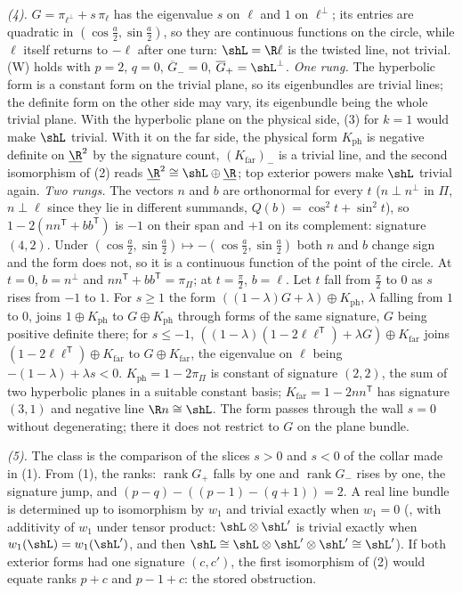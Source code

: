 \emph{(4).} $G = \pi_{\ell^{\perp}} + s\,\pi_{\ell}$ has the eigenvalue $s$ on $\ell$ and $1$ on $\ell^{\perp}$; its entries are quadratic in $(\cos\tfrac a2, \sin\tfrac a2)$, so they are continuous functions on the circle, while $\ell$ itself returns to $-\ell$ after one turn: $\shL = \R\ell$ is the twisted line, not trivial. (W) holds with $p = 2$, $q = 0$, $\overline G_{-} = 0$, $\overline G_{+} = \shL^{\perp}$. \emph{One rung.} The hyperbolic form is a constant form on the trivial plane, so its eigenbundles are trivial lines; the definite form on the other side may vary, its eigenbundle being the whole trivial plane. With the hyperbolic plane on the physical side, (3) for $k = 1$ would make $\shL$ trivial. With it on the far side, the physical form $K_{\mathrm{ph}}$ is negative definite on $\underline{\R}^{2}$ by the signature count, $(K_{\mathrm{far}})_{-}$ is a trivial line, and the second isomorphism of (2) reads $\underline{\R}^{2} \cong \shL \oplus \underline{\R}$; top exterior powers make $\shL$ trivial again. \emph{Two rungs.} The vectors $n$ and $b$ are orthonormal for every $t$ ($n \perp n^{\perp}$ in $\Pi$, $n \perp \ell$ since they lie in different summands, $Q(b) = \cos^{2}t + \sin^{2}t$), so $1 - 2(nn^{\mathsf T} + bb^{\mathsf T})$ is $-1$ on their span and $+1$ on its complement: signature $(4,2)$. Under $(\cos\tfrac a2, \sin\tfrac a2) \mapsto -(\cos\tfrac a2, \sin\tfrac a2)$ both $n$ and $b$ change sign and the form does not, so it is a continuous function of the point of the circle. At $t = 0$, $b = n^{\perp}$ and $nn^{\mathsf T} + bb^{\mathsf T} = \pi_{\Pi}$; at $t = \tfrac\pi2$, $b = \ell$. Let $t$ fall from $\tfrac\pi2$ to $0$ as $s$ rises from $-1$ to $1$. For $s \geq 1$ the form $((1-\lambda)G + \lambda) \oplus K_{\mathrm{ph}}$, $\lambda$ falling from $1$ to $0$, joins $1 \oplus K_{\mathrm{ph}}$ to $G \oplus K_{\mathrm{ph}}$ through forms of the same signature, $G$ being positive definite there; for $s \leq -1$, $((1-\lambda)(1 - 2\ell\ell^{\mathsf T}) + \lambda G) \oplus K_{\mathrm{far}}$ joins $(1 - 2\ell\ell^{\mathsf T}) \oplus K_{\mathrm{far}}$ to $G \oplus K_{\mathrm{far}}$, the eigenvalue on $\ell$ being $-(1-\lambda) + \lambda s < 0$. $K_{\mathrm{ph}} = 1 - 2\pi_{\Pi}$ is constant of signature $(2,2)$, the sum of two hyperbolic planes in a suitable constant basis; $K_{\mathrm{far}} = 1 - 2nn^{\mathsf T}$ has signature $(3,1)$ and negative line $\R n \cong \shL$. The form passes through the wall $s = 0$ without degenerating; there it does not restrict to $G$ on the plane bundle.

\emph{(5).} The class is the comparison of the slices $s > 0$ and $s < 0$ of the collar made in (1). From (1), the ranks: $\operatorname{rank}G_{+}$ falls by one and $\operatorname{rank}G_{-}$ rises by one, the signature jump, and $(p - q) - ((p-1) - (q+1)) = 2$. A real line bundle is determined up to isomorphism by $w_{1}$ and trivial exactly when $w_{1} = 0$ (, with additivity of $w_{1}$ under tensor product: $\shL \otimes \shL'$ is trivial exactly when $w_{1}(\shL) = w_{1}(\shL')$, and then $\shL \cong \shL \otimes \shL' \otimes \shL' \cong \shL'$). If both exterior forms had one signature $(c,c')$, the first isomorphism of (2) would equate ranks $p + c$ and $p - 1 + c$: the stored obstruction.
